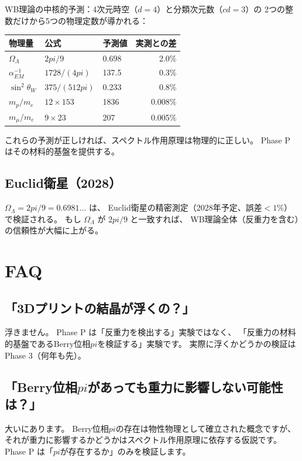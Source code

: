 \documentclass[11pt,a4paper]{article}
\def\pi{pi}%
\def\mathrm#1{#1}%
\def\textbf#1{#1}%
\begin{document}
WB理論の中核的予測：4次元時空（$d=4$）と分類次元数（$\mathrm{cd}=3$）の
2つの整数\textbf{だけ}から5つの物理定数が導かれる：

\begin{center}
\begin{tabular}{lllr}
\toprule
物理量 & 公式 & 予測値 & 実測との差 \\
\midrule
$\Omega_\Lambda$ & $2\pi/9$ & 0.698 & 2.0\% \\
$\alpha_{\mathrm{EM}}^{-1}$ & $1728/(4\pi)$ & 137.5 & 0.3\% \\
$\sin^2\theta_W$ & $375/(512\pi)$ & 0.233 & 0.8\% \\
$m_p/m_e$ & $12 \times 153$ & 1836 & 0.008\% \\
$m_\mu/m_e$ & $9 \times 23$ & 207 & 0.005\% \\
\bottomrule
\end{tabular}
\end{center}

これらの予測が正しければ、スペクトル作用原理は物理的に正しい。
Phase P はその材料的基盤を提供する。

\subsection{Euclid衛星（2028）}

$\Omega_\Lambda = 2\pi/9 = 0.6981...$ は、
Euclid衛星の精密測定（2028年予定、誤差$<1\%$）で検証される。
もし $\Omega_\Lambda$ が $2\pi/9$ と一致すれば、
WB理論全体（反重力を含む）の信頼性が大幅に上がる。


\section{FAQ}

\subsection{「3Dプリントの結晶が浮くの？」}

\textbf{浮きません。} Phase P は「反重力を検出する」実験ではなく、
「反重力の材料的基盤であるBerry位相$\pi$を検証する」実験です。
実際に浮くかどうかの検証は Phase 3（何年も先）。

\subsection{「Berry位相$\pi$があっても重力に影響しない可能性は？」}

\textbf{大いにあります。}
Berry位相$\pi$の存在は物性物理として確立された概念ですが、
それが重力に影響するかどうかはスペクトル作用原理に依存する仮説です。
Phase P は「$\pi$が存在するか」のみを検証します。
\end{document}

